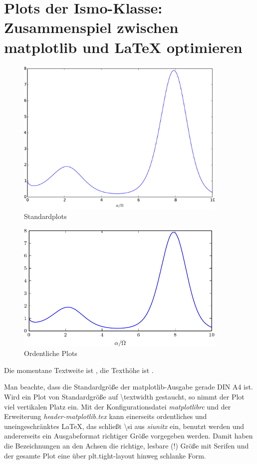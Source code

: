 \section{Plots der Ismo-Klasse: Zusammenspiel zwischen \texorpdfstring{\textsf{matplotlib}}{matplotlib} und \texorpdfstring{\LaTeX}{LaTeX} optimieren}
\begin{figure}[p]
	\centering
	\includegraphics[width=0.9\textwidth,draft,]{Pictures/plot_schlecht.pdf}
	\caption{Standardplots}
\end{figure}
\begin{figure}[p]
	\centering
	\includegraphics[width=0.9\textwidth,draft,]{Pictures/plot_gut.pdf}
	\caption{Ordentliche Plots}
\end{figure}

Die momentane Textweite ist \the\textwidth,
die Texthöhe ist \the\textheight.

Man beachte, dass die Standardgröße der \textsf{matplotlib}-Ausgabe gerade DIN A4 ist. 
Wird ein Plot von  Standardgröße auf \backslash \textsf{textwidth} gestaucht, so nimmt der Plot viel vertikalen Platz ein.
Mit der Konfigurationsdatei \emph{matplotlibrc} und der Erweiterung \emph{header-matplotlib.tex} kann einerseits ordentliches und uneingeschränktes \LaTeX, das schließt \backslash \textsf{si} aus \emph{siunitx} ein,  benutzt werden und
andererseits ein Ausgabeformat richtiger Größe vorgegeben werden.
Damit haben die Bezeichnungen an den Achsen die richtige, lesbare (!) Größe mit Serifen und der gesamte Plot eine über \textsf{plt.tight-layout} hinweg schlanke Form.

